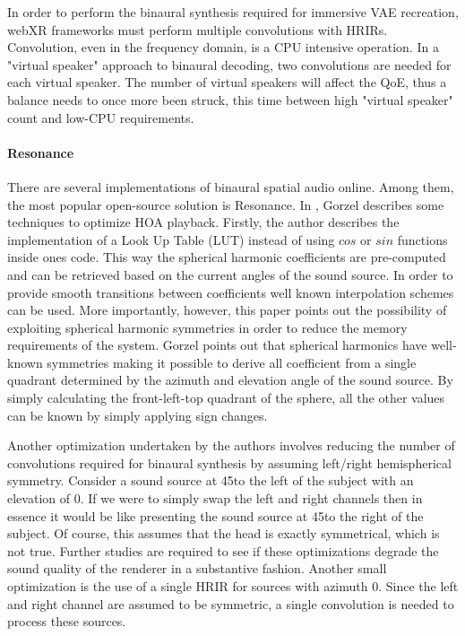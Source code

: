 In order to perform the binaural synthesis required for immersive VAE recreation, webXR frameworks must perform multiple convolutions with HRIRs. Convolution, even in the frequency domain, is a CPU intensive operation. In a "virtual speaker" approach to binaural decoding, two convolutions are needed for each virtual speaker. The number of virtual speakers will affect the QoE, thus a balance needs to once more been struck, this time between high "virtual speaker" count and low-CPU requirements. 

\paragraph{Resonance}

There are several implementations of binaural spatial audio online. Among them, the most popular open-source solution is Resonance. In \cite{gorzel2019efficient}, Gorzel describes some techniques to optimize HOA playback. Firstly, the author describes the implementation of a Look Up Table (LUT) instead of using $cos$ or $sin$ functions inside ones code. This way the spherical harmonic coefficients are pre-computed and can be retrieved based on the current angles of the sound source. In order to provide smooth transitions between coefficients well known interpolation schemes can be used. More importantly, however, this paper points out the possibility of exploiting spherical harmonic symmetries in order to reduce the memory requirements of the system. Gorzel points out that spherical harmonics have well-known symmetries making it possible to derive all coefficient from a single quadrant determined by the azimuth and elevation angle of the sound source. By simply calculating the front-left-top quadrant of the sphere, all the other values can be known by simply applying sign changes. 

Another optimization undertaken by the authors involves reducing the number of convolutions required for binaural synthesis by assuming left/right hemispherical symmetry. Consider a sound source at 45\textdegree to the left of the subject with an elevation of 0\textdegree. If we were to simply swap the left and right channels then in essence it would be like presenting the sound source at 45\textdegree to the right of the subject. Of course, this assumes that the head is exactly symmetrical, which is not true. Further studies are required to see if these optimizations degrade the sound quality of the renderer in a substantive fashion. Another small optimization is the use of a single HRIR for sources with azimuth 0. Since the left and right channel are assumed to be symmetric, a single convolution is needed to process these sources. 



